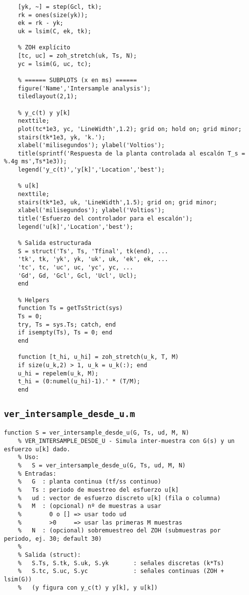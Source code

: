 {\begin{lstlisting}[style=matlabstyle,caption={Visualización del comportamiento inter-muestra.}]
	% Respuestas discretas
	[yk, ~] = step(Gcl, tk);
	rk = ones(size(yk));
	ek = rk - yk;
	uk = lsim(C, ek, tk);
	
	% ZOH explícito
	[tc, uc] = zoh_stretch(uk, Ts, N);
	yc = lsim(G, uc, tc);
	
	% ====== SUBPLOTS (x en ms) ======
	figure('Name','Intersample analysis');
	tiledlayout(2,1);
	
	% y_c(t) y y[k]
	nexttile;
	plot(tc*1e3, yc, 'LineWidth',1.2); grid on; hold on; grid minor;
	stairs(tk*1e3, yk, 'k.');
	xlabel('milisegundos'); ylabel('Voltios');
	title(sprintf('Respuesta de la planta controlada al escalón T_s = %.4g ms',Ts*1e3));
	legend('y_c(t)','y[k]','Location','best');
	
	% u[k]
	nexttile;
	stairs(tk*1e3, uk, 'LineWidth',1.5); grid on; grid minor;
	xlabel('milisegundos'); ylabel('Voltios');
	title('Esfuerzo del controlador para el escalón');
	legend('u[k]','Location','best');
	
	% Salida estructurada
	S = struct('Ts', Ts, 'Tfinal', tk(end), ...
	'tk', tk, 'yk', yk, 'uk', uk, 'ek', ek, ...
	'tc', tc, 'uc', uc, 'yc', yc, ...
	'Gd', Gd, 'Gcl', Gcl, 'Ucl', Ucl);
	end
	
	% Helpers
	function Ts = getTsStrict(sys)
	Ts = 0;
	try, Ts = sys.Ts; catch, end
	if isempty(Ts), Ts = 0; end
	end
	
	function [t_hi, u_hi] = zoh_stretch(u_k, T, M)
	if size(u_k,2) > 1, u_k = u_k(:); end
	u_hi = repelem(u_k, M);
	t_hi = (0:numel(u_hi)-1).' * (T/M);
	end
\end{lstlisting}

\subsection{\texttt{ver\_intersample\_desde\_u.m}}
\begin{lstlisting}[style=matlabstyle,caption={Reconstrucción inter-muestra desde $u[k]$.}]
	function S = ver_intersample_desde_u(G, Ts, ud, M, N)
	% VER_INTERSAMPLE_DESDE_U - Simula inter-muestra con G(s) y un esfuerzo u[k] dado.
	% Uso:
	%   S = ver_intersample_desde_u(G, Ts, ud, M, N)
	% Entradas:
	%   G  : planta continua (tf/ss continuo)
	%   Ts : periodo de muestreo del esfuerzo u[k]
	%   ud : vector de esfuerzo discreto u[k] (fila o columna)
	%   M  : (opcional) nº de muestras a usar
	%        0 o [] => usar todo ud
	%        >0     => usar las primeras M muestras
	%   N  : (opcional) sobremuestreo del ZOH (submuestras por periodo, ej. 30; default 30)
	%
	% Salida (struct):
	%   S.Ts, S.tk, S.uk, S.yk       : señales discretas (k*Ts)
	%   S.tc, S.uc, S.yc             : señales continuas (ZOH + lsim(G))
	%   (y figura con y_c(t) y y[k], y u[k])
	

\end{lstlisting}}
